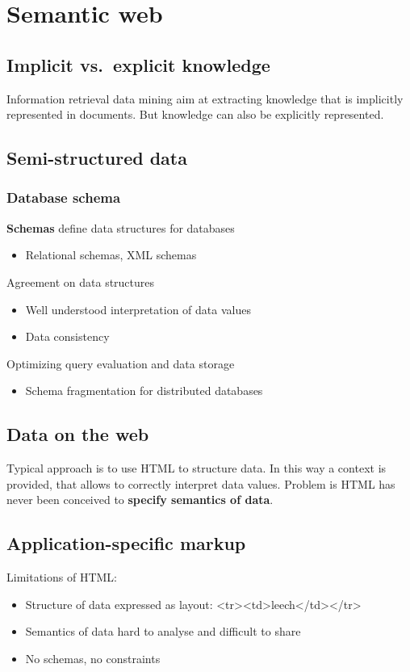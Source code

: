 \section{Semantic web}

\subsection{Implicit vs.\ explicit knowledge}
Information retrieval data mining aim at extracting knowledge that is
implicitly represented in documents. But knowledge can also be
explicitly represented.

\subsection{Semi-structured data}
\subsubsection{Database schema}
\textbf{Schemas} define data structures for databases
\begin{itemize}
\item Relational schemas, XML schemas
\end{itemize}
Agreement on data structures
\begin{itemize}
\item Well understood interpretation of data values
\item Data consistency
\end{itemize}
Optimizing query evaluation and data storage
\begin{itemize}
\item Schema fragmentation for distributed databases
\end{itemize}

\subsection{Data on the web}
Typical approach is to use HTML to structure data. In this way a
context is provided, that allows to correctly interpret data
values. Problem is HTML has never been conceived to \textbf{specify
  semantics of data}.

\subsection{Application-specific markup}
Limitations of HTML:
\begin{itemize}
\item Structure of data expressed as layout: <tr><td>leech</td></tr>
\item Semantics of data hard to analyse and difficult to share
\item No schemas, no constraints
\end{itemize}


